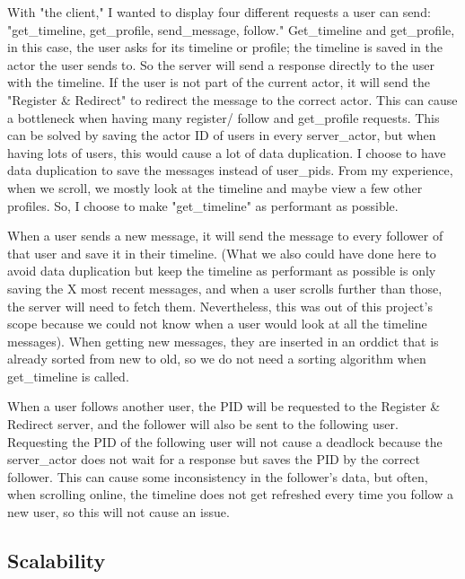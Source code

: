 \documentclass[a4paper]{article}
\begin{document}
With "the client," I wanted to display four different requests a user can send: "get\_timeline, get\_profile, send\_message, follow."
Get\_timeline and get\_profile, in this case, the user asks for its timeline or profile; the timeline is saved in the actor the user sends to.
So the server will send a response directly to the user with the timeline.
If the user is not part of the current actor, it will send the "Register \& Redirect" to redirect the message to the correct actor.
This can cause a bottleneck when having many register/ follow and get\_profile requests.
This can be solved by saving the actor ID of users in every server\_actor, but when having lots of users, this would cause a lot of data duplication.
I choose to have data duplication to save the messages instead of user\_pids.
From my experience, when we scroll, we mostly look at the timeline and maybe view a few other profiles.
So, I choose to make "get\_timeline" as performant as possible. 

When a user sends a new message, it will send the message to every follower of that user and save it in their timeline. (What we also could have done here to avoid data duplication but keep the timeline as performant as possible is only saving the X most recent messages, and when a user scrolls further than those, the server will need to fetch them. Nevertheless, this was out of this project's scope because we could not know when a user would look at all the timeline messages). When getting new messages, they are inserted in an orddict that is already sorted from new to old, so we do not need a sorting algorithm when get\_timeline is called.

When a user follows another user, the PID will be requested to the Register \& Redirect server, and the follower will also be sent to the following user. 
Requesting the PID of the following user will not cause a deadlock because the server\_actor does not wait for a response but saves the PID by the correct follower. This can cause some inconsistency in the follower's data, but often, when scrolling online, the timeline does not get refreshed every time you follow a new user, so this will not cause an issue. 

%

\subsection{Scalability}
\end{document}
